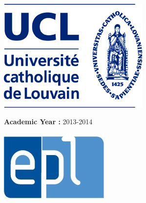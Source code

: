 \begin{center}
\begin{minipage}{0.25\textwidth}
\begin{flushleft}
\includegraphics[scale=0.25]{Pictures/ucl-logo.jpg}
\end{flushleft}
\end{minipage}
\begin{minipage}{0.48\textwidth}
\begin{center}
\Large{\textbf{Academic Year :} 2013-2014}
\end{center}
\end{minipage}
\begin{minipage}{0.25\textwidth}
\begin{flushright}
\includegraphics[scale=0.5]{Pictures/epl-logo.jpg}
\end{flushright}
\end{minipage}
\end{center}